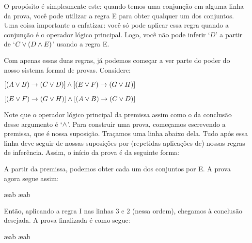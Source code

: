  
O propósito é simplesmente este: quando temos uma conjunção em alguma linha da prova, você pode utilizar a regra {\eand}E  para obter qualquer um dos conjuntos. 
Uma coisa importante a enfatizar: você só pode aplicar essa regra quando a conjunção é o operador lógico principal. Logo, você não pode inferir `$D$' a partir de `$C \vee (D \wedge E)$' usando a regra {\eand}E.

Com apenas essas duas regras, já podemos começar a ver parte do poder do nosso sistema formal de provas.  Considere: 
\begin{earg}
\item[] $[(A\vee B)\rightarrow(C\vee D)] \wedge [(E \vee F) \rightarrow (G\vee H)]$
\item[\therefore] $[(E \vee F) \rightarrow (G\vee H)] \wedge [(A\vee B)\rightarrow(C\vee D)]$
\end{earg}
Note que o operador lógico principal da premissa assim como o da conclusão  desse argumento é `$\wedge$'.  Para construir uma prova, começamos escrevendo a premissa, que é nossa suposição. Traçamos uma linha abaixo dela. Tudo após essa linha deve seguir de nossas suposições por  (repetidas aplicações de) nossas regras de inferência. Assim, o início da prova é da seguinte forma: 
\begin{fitchproof}
\end{fitchproof}
A partir da premissa, podemos obter cada um dos conjuntos por  {\eand}E. A prova agora segue assim: 
\begin{fitchproof}
	 \ae{ab}
	 \ae{ab}
\end{fitchproof}
Então, aplicando a regra {\eand}I  nas linhas 3 e 2 (nessa ordem), chegamos à conclusão desejada. A  prova finalizada é como segue:


\begin{fitchproof}
	 \ae{ab}
	 \ae{ab}
	 
\end{fitchproof}

